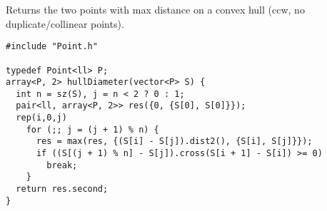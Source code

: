 Returns the two points with max distance on a convex hull (ccw, no duplicate/collinear points).
\begin{verbatim}
#include "Point.h"

typedef Point<ll> P;
array<P, 2> hullDiameter(vector<P> S) {
  int n = sz(S), j = n < 2 ? 0 : 1;
  pair<ll, array<P, 2>> res({0, {S[0], S[0]}});
  rep(i,0,j)
    for (;; j = (j + 1) % n) {
      res = max(res, {(S[i] - S[j]).dist2(), {S[i], S[j]}});
      if ((S[(j + 1) % n] - S[j]).cross(S[i + 1] - S[i]) >= 0)
        break;
    }
  return res.second;
}

\end{verbatim}